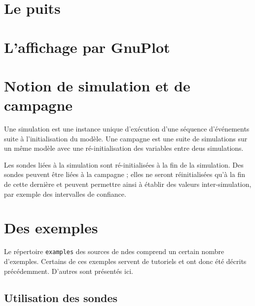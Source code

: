 \documentclass{article}
\begin{document}
\section{Le puits}
\label{section:puits}

%
\section{L'affichage par GnuPlot}
\label{section:gnuplot}

%
\section{Notion de simulation et de campagne}

   Une simulation est une instance unique d'exécution d'une séquence
d'événements suite à l'initialisation du modèle. Une campagne est une
suite de simulations sur un même modèle avec une ré-initialisation des
variables entre deus simulations.

   Les sondes liées à la simulation sont ré-initialisées à la fin de
la simulation. Des sondes peuvent être liées à la campagne ; elles ne
seront réinitialisées qu'à la fin de cette dernière et peuvent
permettre ainsi à établir des valeurs inter-simulation, par exemple
des intervalles de confiance.


%
\section{Des exemples}

   Le répertoire {\tt examples} des sources de {\sc ndes} comprend un
certain nombre d'exemples. Certains de ces exemples servent de
tutoriels et ont donc été décrits précédemment. D'autres sont
présentés ici.

%
\subsection{Utilisation des sondes}
\end{document}
